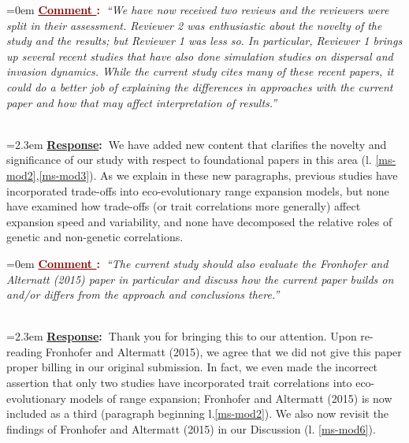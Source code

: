 \documentclass[12pt]{article}
\newcounter{cN}
\newcommand{\comment}[1]{
	\vspace{2em}
	\refstepcounter{cN} %
	\noindent \hangindent=0em \textbf{\textcolor{Maroon}{\uline{Comment \thecN}:~}}\emph{``#1''}
	}
\newcommand{\response}[1]{
	\\[0.25em]
	\hangindent=2.3em \textbf{\textcolor{NavyBlue}{\uline{Response}:~}}#1
	}
\begin{document}
\comment{We have now received two reviews and the reviewers were split in their assessment. Reviewer 2 was enthusiastic about the novelty of the study and the results; but Reviewer 1 was less so.
In particular, Reviewer 1 brings up several recent studies that have also done simulation studies on dispersal and invasion dynamics.
While the current study cites many of these recent papers, it could do a better job of explaining the differences in approaches with the current paper and how that may affect interpretation of results.}
\response{We have added new content that clarifies the novelty and significance of our study with respect to foundational papers in this area (l. \ref{ms-mod2},\ref{ms-mod3}).
As we explain in these new paragraphs, previous studies have incorporated trade-offs into eco-evolutionary range expansion models, but none have examined how trade-offs (or trait correlations more generally) affect expansion speed and variability, and none have decomposed the relative roles of genetic and non-genetic correlations.
}

\comment{The current study should also evaluate the Fronhofer and Alternatt (2015) paper in particular and discuss how the current paper builds on and/or differs from the approach and conclusions there.}
\response{Thank you for bringing this to our attention. Upon re-reading Fronhofer and Altermatt (2015), we agree that we did not give this paper proper billing in our original submission.
In fact, we even made the incorrect assertion that only two studies have incorporated trait correlations into eco-evolutionary models of range expansion; Fronhofer and Altermatt (2015) is now included as a third (paragraph beginning l.\ref{ms-mod2}).
We also now revisit the findings of Fronhofer and Altermatt (2015) in our Discussion (l. \ref{ms-mod6}).
}
\end{document}
